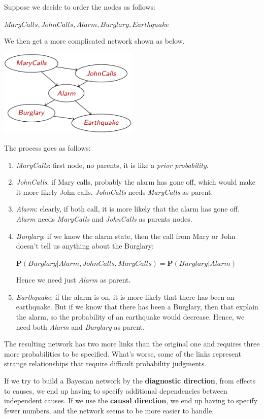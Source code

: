 \begin{example}
    Suppose we decide to
    order the nodes as follows:
    \begin{center}
        $MaryCalls, JohnCalls, Alarm, Burglary, Earthquake$
    \end{center}
    We then get a more complicated network shown as below. \vspace{3.5pt}
    \begin{center}
        \includegraphics[width=0.5\textwidth]{img/img6.png}
    \end{center} \vspace{3.5pt}
    The process goes as follows:
    \begin{enumerate}
        \item \textit{MaryCalls}: first node, no parents, it is like a \textit{prior probability}.
        \item \textit{JohnCalls}: if Mary calls, probably the alarm has gone off, which would make it more likely John calls. \textit{JohnCalls} needs \textit{MaryCalls} as parent.
        \item \textit{Alarm}: clearly, if both call, it is more likely that the alarm has gone off. \textit{Alarm} needs \textit{MaryCalls} and \textit{JohnCalls} as parents nodes.
        \item \textit{Burglary}: if we know the alarm state, then the call from Mary or John doesn't tell us anything about the Burglary: 
        \begin{center}
            $\mathbf{P}(Burglary|Alarm, JohnCalls, MaryCalls) = \mathbf{P}(Burglary|Alarm)$    
        \end{center}
        Hence we need just \textit{Alarm} as parent.
        \item \textit{Earthquake}: if the alarm is on, it is more likely that there has been an earthquake. But if we know that there has been a Burglary, then that explain the alarm, so the probability of an earthquake would decrease. Hence, we need both \textit{Alarm} and \textit{Burglary} as parent.
    \end{enumerate} \vspace{3.5pt}

    The resulting network has two more links than the original one and requires three more probabilities to be specified. What's worse, some of the links represent strange relationships
    that require difficult probability judgments. 
\end{example}
If we try to build a Bayesian network by the \textbf{diagnostic direction}, from effects to causes, we end up having to specify additional dependencies between independent causes. If we use the \textbf{causal direction}, we end up having to 
specify fewer numbers, and the network seems to be more easier to handle.